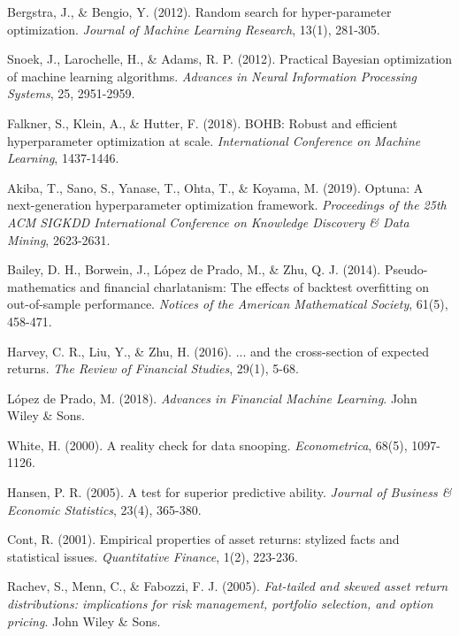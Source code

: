 \documentclass[12pt,a4paper]{article}
\begin{document}
\begin{thebibliography}{99}
Bergstra, J., \& Bengio, Y. (2012). Random search for hyper-parameter optimization. \textit{Journal of Machine Learning Research}, 13(1), 281-305.

Snoek, J., Larochelle, H., \& Adams, R. P. (2012). Practical Bayesian optimization of machine learning algorithms. \textit{Advances in Neural Information Processing Systems}, 25, 2951-2959.

Falkner, S., Klein, A., \& Hutter, F. (2018). BOHB: Robust and efficient hyperparameter optimization at scale. \textit{International Conference on Machine Learning}, 1437-1446.

Akiba, T., Sano, S., Yanase, T., Ohta, T., \& Koyama, M. (2019). Optuna: A next-generation hyperparameter optimization framework. \textit{Proceedings of the 25th ACM SIGKDD International Conference on Knowledge Discovery \& Data Mining}, 2623-2631.

Bailey, D. H., Borwein, J., López de Prado, M., \& Zhu, Q. J. (2014). Pseudo-mathematics and financial charlatanism: The effects of backtest overfitting on out-of-sample performance. \textit{Notices of the American Mathematical Society}, 61(5), 458-471.

Harvey, C. R., Liu, Y., \& Zhu, H. (2016). ... and the cross-section of expected returns. \textit{The Review of Financial Studies}, 29(1), 5-68.

López de Prado, M. (2018). \textit{Advances in Financial Machine Learning}. John Wiley \& Sons.

White, H. (2000). A reality check for data snooping. \textit{Econometrica}, 68(5), 1097-1126.

Hansen, P. R. (2005). A test for superior predictive ability. \textit{Journal of Business \& Economic Statistics}, 23(4), 365-380.

Cont, R. (2001). Empirical properties of asset returns: stylized facts and statistical issues. \textit{Quantitative Finance}, 1(2), 223-236.

Rachev, S., Menn, C., \& Fabozzi, F. J. (2005). \textit{Fat-tailed and skewed asset return distributions: implications for risk management, portfolio selection, and option pricing}. John Wiley \& Sons.


\end{thebibliography}
\end{document}
